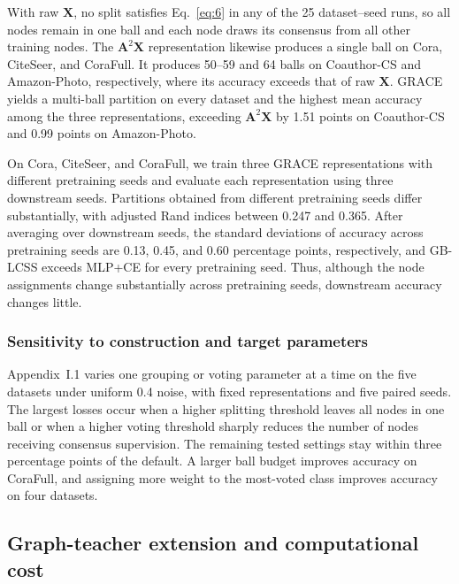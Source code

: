 \documentclass[10pt,letterpaper,nopreprintline]{elsarticle}
\theoremstyle{definition}
\theoremstyle{plain}
\begin{document}


With raw \(\mathbf{X}\), no split satisfies Eq.~\eqref{eq:6} in any of the 25 dataset--seed runs, so all nodes remain in one ball and each node draws its consensus from all other training nodes. The \(\mathbf{A}^2\mathbf{X}\) representation likewise produces a single ball on Cora, CiteSeer, and CoraFull. It produces 50--59 and 64 balls on Coauthor-CS and Amazon-Photo, respectively, where its accuracy exceeds that of raw \(\mathbf{X}\). GRACE yields a multi-ball partition on every dataset and the highest mean accuracy among the three representations, exceeding \(\mathbf{A}^2\mathbf{X}\) by 1.51 points on Coauthor-CS and 0.99 points on Amazon-Photo. 

On Cora, CiteSeer, and CoraFull, we train three GRACE representations with different pretraining seeds and evaluate each representation using three downstream seeds. Partitions obtained from different pretraining seeds differ substantially, with adjusted Rand indices \cite{ref74} between 0.247 and 0.365. After averaging over downstream seeds, the standard deviations of accuracy across pretraining seeds are 0.13, 0.45, and 0.60 percentage points, respectively, and GB-LCSS exceeds MLP+CE for every pretraining seed. Thus, although the node assignments change substantially across pretraining seeds, downstream accuracy changes little.

\subsubsection{Sensitivity to construction and target parameters}\label{sec:4.3.4}

Appendix~I.1 varies one grouping or voting parameter at a time on the five datasets under uniform 0.4 noise, with fixed representations and five paired seeds. The largest losses occur when a higher splitting threshold leaves all nodes in one ball or when a higher voting threshold sharply reduces the number of nodes receiving consensus supervision. The remaining tested settings stay within three percentage points of the default. A larger ball budget improves accuracy on CoraFull, and assigning more weight to the most-voted class improves accuracy on four datasets.

\subsection{Graph-teacher extension and computational cost}\label{sec:4.4}
\end{document}
